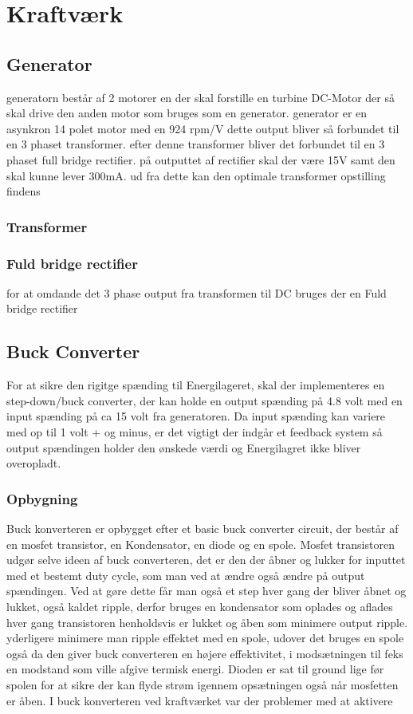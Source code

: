 \documentclass[../main.tex]{subfiles}
\begin{document}
\chapter{Kraftværk} \label{Chap:Kraftværk}

\section{Generator}
generatorn består af 2 motorer en der skal forstille en turbine DC-Motor der så skal drive den anden motor som bruges som en generator. generator er en asynkron 14 polet motor med en 924 rpm/V dette output bliver så forbundet til en 3 phaset transformer. efter denne transformer bliver det forbundet til en 3 phaset full bridge rectifier. på outputtet af rectifier skal der være 15V samt den skal kunne lever 300mA. ud fra dette kan den optimale transformer opstilling findens
\subsection{Transformer}
\subsection{Fuld bridge rectifier}
for at omdande det 3 phase output fra transformen til DC bruges der en Fuld bridge rectifier





\section{Buck Converter}
For at sikre den rigitge spænding til Energilageret, skal der implementeres en step-down/buck converter, der kan holde en output spænding på 4.8 volt med en input spænding på ca 15 volt fra generatoren. Da input spænding kan variere med op til 1 volt + og minus, er det vigtigt der indgår et feedback system så output spændingen holder den ønskede værdi og Energilagret ikke bliver overopladt.

\subsection{Opbygning}
Buck konverteren er opbygget efter et basic buck converter circuit, der består af en mosfet transistor, en Kondensator, en diode og en spole. Mosfet transistoren udgør selve ideen af buck converteren, det er den der åbner og lukker for inputtet med et bestemt duty cycle, som man ved at ændre også ændre på output spændingen. Ved at gøre dette får man også et step hver gang der bliver åbnet og lukket, også kaldet ripple, derfor bruges en kondensator som oplades og aflades hver gang transistoren henholdsvis er lukket og åben som minimere output ripple. yderligere minimere man ripple effektet med en spole, udover det bruges en spole også da den giver buck converteren en højere effektivitet, i modsætningen til feks en modstand som ville afgive termisk energi. Dioden er sat til ground lige før spolen for at sikre der kan flyde strøm igennem opsætningen også når mosfetten er åben. 
I buck konverteren ved kraftværket var der problemer med at aktivere 
\end{document}
